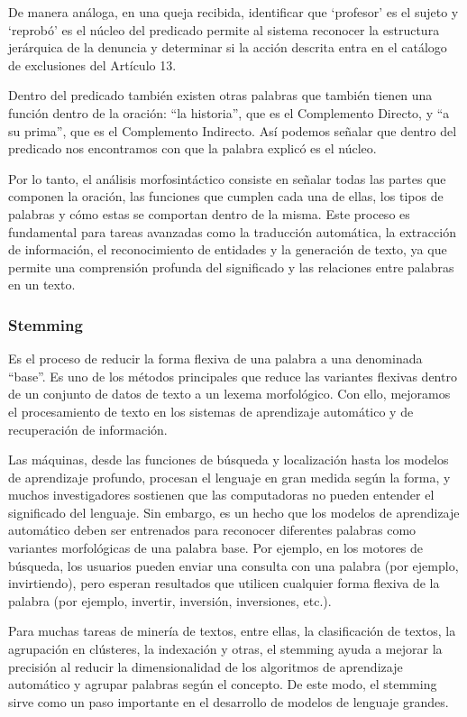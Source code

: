 De manera análoga, en una queja recibida, identificar que ‘profesor’ es el sujeto y ‘reprobó’ es el núcleo del predicado permite al sistema reconocer la estructura jerárquica de la denuncia y determinar si la acción descrita entra en el catálogo de exclusiones del Artículo 13.

Dentro del predicado también existen otras palabras que también tienen una función dentro de la oración: “la historia”, que es el Complemento Directo, y “a su prima”, que es el Complemento Indirecto. Así podemos señalar que dentro del predicado nos encontramos con que la palabra explicó es el núcleo.

Por lo tanto, el análisis morfosintáctico consiste en señalar todas las partes que componen la oración, las funciones que cumplen cada una de ellas, los tipos de palabras y cómo estas se comportan dentro de la misma. Este proceso es fundamental para tareas avanzadas como la traducción automática, la extracción de información, el reconocimiento de entidades y la generación de texto, ya que permite una comprensión profunda del significado y las relaciones entre palabras en un texto.

\subsubsection{Stemming}

Es el proceso de reducir la forma flexiva de una palabra a una denominada “base”. Es uno de los métodos principales que reduce las variantes flexivas dentro de un conjunto de datos de texto a un lexema morfológico. Con ello, mejoramos el procesamiento de texto en los sistemas de aprendizaje automático y de recuperación de información.

Las máquinas, desde las funciones de búsqueda y localización hasta los modelos de aprendizaje profundo, procesan el lenguaje en gran medida según la forma, y muchos investigadores sostienen que las computadoras no pueden entender el significado del lenguaje. Sin embargo, es un hecho que los modelos de aprendizaje automático deben ser entrenados para reconocer diferentes palabras como variantes morfológicas de una palabra base. Por ejemplo, en los motores de búsqueda, los usuarios pueden enviar una consulta con una palabra (por ejemplo, invirtiendo), pero esperan resultados que utilicen cualquier forma flexiva de la palabra (por ejemplo, invertir, inversión, inversiones, etc.).

Para muchas tareas de minería de textos, entre ellas, la clasificación de textos, la agrupación en clústeres, la indexación y otras, el stemming ayuda a mejorar la precisión al reducir la dimensionalidad de los algoritmos de aprendizaje automático y agrupar palabras según el concepto. De este modo, el stemming sirve como un paso importante en el desarrollo de modelos de lenguaje grandes.

